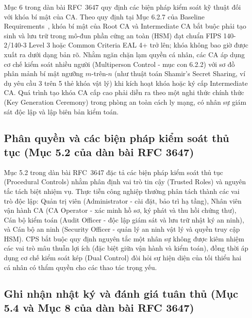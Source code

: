 Mục 6 trong dàn bài RFC~3647 quy định các biện pháp kiểm soát kỹ thuật đối với khóa bí mật của CA. Theo quy định tại Mục 6.2.7 của Baseline Requirements~\cite{cabforum_br}, khóa bí mật của Root CA và Intermediate CA bắt buộc phải tạo sinh và lưu trữ trong mô-đun phần cứng an toàn (HSM) đạt chuẩn FIPS 140-2/140-3 Level 3 hoặc Common Criteria EAL 4+ trở lên; khóa không bao giờ được xuất ra dưới dạng bản rõ. Nhằm ngăn chặn lạm quyền cá nhân, các CA áp dụng cơ chế kiểm soát nhiều người (Multiperson Control - mục con 6.2.2) với sơ đồ phân mảnh bí mật ngưỡng $m$-trên-$n$ (như thuật toán Shamir's Secret Sharing, ví dụ yêu cầu 3 trên 5 thẻ khóa vật lý) khi kích hoạt khóa hoặc ký cấp Intermediate CA. Quá trình tạo khóa CA cấp cao phải diễn ra theo một nghi thức chính thức (Key Generation Ceremony) trong phòng an toàn cách ly mạng, có nhân sự giám sát độc lập và lập biên bản kiểm toán.

\subsection{Phân quyền và các biện pháp kiểm soát thủ tục (Mục 5.2 của dàn bài RFC 3647)}
\label{subsec:procedural-controls}

Mục 5.2 trong dàn bài RFC~3647 đặc tả các biện pháp kiểm soát thủ tục (Procedural Controls) nhằm phân định vai trò tin cậy (Trusted Roles) và nguyên tắc tách biệt nhiệm vụ. Thực tiễn công nghiệp thường phân tách thành các vai trò độc lập: Quản trị viên (Administrator - cài đặt, bảo trì hạ tầng), Nhân viên vận hành CA (CA Operator - xác minh hồ sơ, ký phát và thu hồi chứng thư), Cán bộ kiểm toán (Audit Officer - độc lập giám sát và lưu trữ nhật ký an ninh), và Cán bộ an ninh (Security Officer - quản lý an ninh vật lý và quyền truy cập HSM). CPS bắt buộc quy định nguyên tắc một nhân sự không được kiêm nhiệm các vai trò mâu thuẫn lợi ích (đặc biệt giữa vận hành và kiểm toán), đồng thời áp dụng cơ chế kiểm soát kép (Dual Control) đòi hỏi sự hiện diện của tối thiểu hai cá nhân có thẩm quyền cho các thao tác trọng yếu.

\subsection{Ghi nhận nhật ký và đánh giá tuân thủ (Mục 5.4 và Mục 8 của dàn bài RFC 3647)}
\label{subsec:audit-log-compliance}

